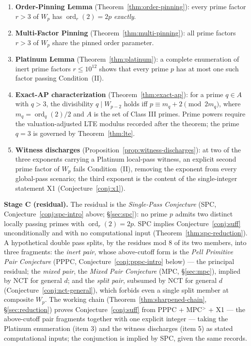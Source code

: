 \documentclass[11pt]{amsart}
\theoremstyle{plain}
\theoremstyle{definition}
\theoremstyle{remark}
\numberwithin{equation}{section}
\newcommand{\ord}{\operatorname{ord}}
\begin{document}
\begin{enumerate}
\item \textbf{Order-Pinning Lemma} (Theorem~\ref{thm:order-pinning}): every prime factor $r > 3$ of $W_p$ has $\ord_r(2) = 2p$ \emph{exactly}.
\item \textbf{Multi-Factor Pinning} (Theorem~\ref{thm:multi-pinning}): all prime factors $r > 3$ of $W_p$ share the pinned order parameter.
\item \textbf{Platinum Lemma} (Theorem~\ref{thm:platinum}): a complete enumeration of inert prime factors $r \leq 10^{12}$ shows that every prime $p$ has at most one such factor passing Condition~(II).
\item \textbf{Exact-AP characterization} (Theorem~\ref{thm:exact-ap}): for a prime $q \in A$ with $q > 3$, the divisibility $q \mid W_{p-2}$ holds iff $p \equiv m_q + 2 \pmod{2 m_q}$, where $m_q = \ord_q(2)/2$ and $A$ is the set of Class III primes. Prime powers require the valuation-adjusted LTE modulus recorded after the theorem; the prime $q = 3$ is governed by Theorem~\ref{thm:lte}.
\item \textbf{Witness discharges} (Proposition~\ref{prop:witness-discharges}): at two of the three exponents carrying a Platinum local-pass witness, an explicit second prime factor of $W_p$ fails Condition~(II), removing the exponent from every global-pass scenario; the third exponent is the content of the single-integer statement X1 (Conjecture~\ref{conj:x1}).
\end{enumerate}

\textbf{Stage C (residual).} The residual is the \emph{Single-Pass Conjecture} (SPC, Conjecture~\ref{conj:spc-intro} above; \S\ref{sec:spc}): no prime $p$ admits two distinct locally passing primes with $\ord_r(2) = 2p$. SPC implies Conjecture~\ref{conj:suff} unconditionally and with no computational input (Theorem~\ref{thm:spc-reduction}). A hypothetical double pass splits, by the residues mod $8$ of its two members, into three fragments: the \emph{inert pair}, whose above-cutoff form is the \emph{Pell Primitive Pair Conjecture} (PPPC, Conjecture~\ref{conj:pppc-intro} below) --- the principal residual; the \emph{mixed pair}, the \emph{Mixed Pair Conjecture} (MPC, \S\ref{sec:mpc}), implied by NCT for general $d$; and the \emph{split pair}, subsumed by NCT for general $d$ (Conjecture~\ref{conj:nct-general}), which forbids even a single split member at composite $W_p$. The working chain (Theorem~\ref{thm:sharpened-chain}, \S\ref{sec:reduction}) proves Conjecture~\ref{conj:suff} from PPPC + MPC$^{>}$ + X1 --- the above-cutoff pair fragments together with one explicit integer --- taking the Platinum enumeration (item 3) and the witness discharges (item 5) as stated computational inputs; the conjunction is implied by SPC, given the same records.
\end{document}

